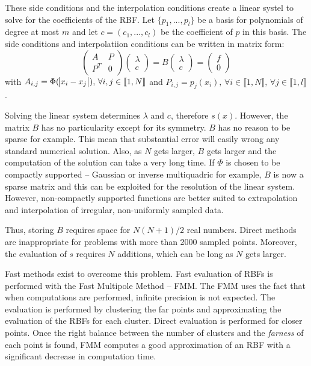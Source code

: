 \documentclass[12pt]{article}
\begin{document}
These side conditions and the interpolation conditions create a linear systel to solve for the coefficients of the RBF. Let $\{p_1, ..., p_l\}$ be a basis for polynomials of degree at most $m$ and let $c = (c_1, ..., c_l)$ be the coefficient of $p$ in this basis. The side conditions and interpolatiion conditions can be written in matrix form:
$$
\begin{pmatrix}
A & P \\
P^T & 0
\end{pmatrix}
\begin{pmatrix}
\lambda \\
c
\end{pmatrix}
= B
\begin{pmatrix}
\lambda \\
c
\end{pmatrix}
=
\begin{pmatrix}
f \\
0
\end{pmatrix}
$$
with $A_{i,j} = \Phi(\abs{x_i - x_j})\text{, }\forall i,j \in \llbracket 1, N\rrbracket$ and $P_{i,j} = p_j(x_i)\text{, }\forall i \in \llbracket 1, N\rrbracket\text{, }\forall j \in \llbracket 1, l\rrbracket$.

Solving the linear system determines $\lambda$ and $c$, therefore $s(x)$. However, the matrix $B$ has no particularity except for its symmetry. $B$ has no reason to be sparse for example. This mean that substantial error will easily wrong any standard numerical solution. Also, as $N$ gets larger, $B$ gets larger and the computation of the solution can take a very long time. If $\Phi$ is chosen to be compactly supported -- Gaussian or inverse multiquadric for example, $B$ is now a sparse matrix and this can be exploited for the resolution of the linear system. However, non-compactly supported functions are better suited to extrapolation and interpolation of irregular, non-uniformly sampled data.

Thus, storing $B$ requires space for $N(N+1)/2$ real numbers. Direct methods are inappropriate for problems with more than 2000 sampled points. Moreover, the evaluation of $s$ requires $N$ additions, which can be long as $N$ gets larger.

Fast methods exist to overcome this problem. Fast evaluation of RBFs is performed with the Fast Multipole Method -- FMM. The FMM uses the fact that when computations are performed, infinite precision is not expected. The evaluation is performed by clustering the far points and approximating the evaluation of the RBFs for each cluster. Direct evaluation is performed for closer points. Once the right balance between the number of clusters and the \emph{farness} of each point is found, FMM computes a good approximation of an RBF with a significant decrease in computation time.
\end{document}
